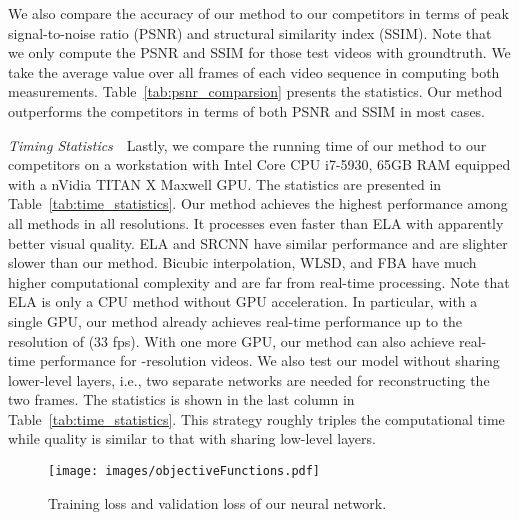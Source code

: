 \documentclass[acmtog]{acmart}
\begin{document}
We also compare the accuracy of our method to our competitors in terms of peak
signal-to-noise ratio (PSNR) and structural similarity index (SSIM). Note that
we only compute the PSNR and SSIM for those test videos with groundtruth. We
take the average value over all frames of each video sequence in computing both
measurements. Table~\ref{tab:psnr_comparsion} presents the statistics. Our
method outperforms the competitors in terms of both PSNR
and SSIM in most cases.

\vspace{0.15in}
\noindent\emph{Timing Statistics}\,\,\,\,
Lastly, we compare the running time of our method to our competitors on a
workstation with Intel Core CPU i7-5930, 65GB RAM equipped with a nVidia TITAN X
Maxwell GPU. The statistics are presented in Table~\ref{tab:time_statistics}.
Our method achieves the highest performance among all methods in all
resolutions. It processes even faster than ELA with apparently better visual
quality. ELA and SRCNN have similar performance and are slighter slower than our
method. Bicubic interpolation, WLSD, and FBA have much higher computational
complexity and are far from real-time processing.  Note that ELA is only a CPU
method without GPU acceleration. In particular, with a single GPU, our method
already achieves real-time performance up to the resolution of 
(33 fps). With one more GPU, our method can also achieve real-time performance
for -resolution videos. We also test our model without sharing
lower-level layers, i.e., two separate networks are needed for reconstructing
the two frames. The statistics is shown in the last column in
Table~\ref{tab:time_statistics}. This strategy roughly triples the computational
time while quality is similar to that with sharing low-level layers.



\begin{figure}[!tp]
	\centering
	\texttt{[image: images/objectiveFunctions.pdf]}\\
	\caption{Training loss and validation loss of our neural network.}\label{fig:training_loss}
\end{figure}
\end{document}
